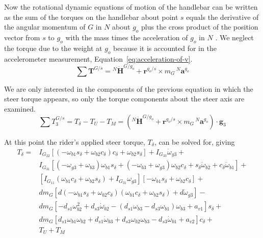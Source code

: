 \documentclass[10pt]{article}
\begin{document}
Now the rotational dynamic equations of motion of the handlebar can be written as the sum
of the torques on the handlebar about point $s$ equals the derivative of
the angular momentum of $G$ in $N$ about $g_o$ plus the cross product of the
position vector from $s$ to $g_o$ with the mass times the acceleration of $g_o$ in $N$
\cite{Meriam1975}. We neglect the torque due to the weight at $g_o$ because it
is accounted for in the accelerometer measurement, Equation~\ref{eq:acceleration-of-v}.
%
\begin{equation}
  \sum \mathbf{T}^{G/s} = {}^N\dot{\mathbf{H}}^{G/g_o} +
    \mathbf{r}^{g_o/s} \times m_G\,{}^N\mathbf{a}^{g_o}
\end{equation}

We are only interested in the components of the previous equation in which the
steer torque appears, so only the torque components about the steer axis are examined.
%
\begin{equation}
  \sum T^{G/s}_3 = T_\delta - T_U - T_M = \left({}^N\dot{\mathbf{H}}^{G/g_o} +
  \mathbf{r}^{g_o/s} \times m_G\,{}^N\mathbf{a}^{g_o}\right) \cdot \hat{\mathbf{g}}_3
\end{equation}

At this point the rider's applied steer torque, $T_\delta$, can be solved for,
giving
%
\begin{align}
  T_{\delta} =
    & I_{G_{22}} \left[ \left( -\omega_{b1} s_\delta + \omega_{b2} c_\delta \right)
      c_\delta + \omega_{b2} s_\delta \right] + I_{G_{33}} \dot{\omega}_{g3} + \nonumber \\
    & I_{G_{31}} \left[ (-\omega_{g3} + \omega_{b3} ) \omega_{b1} s_\delta +
      (-\omega_{b3} + \omega_{g3}) \omega_{b2} c_\delta +
      s_\delta \dot{\omega}_{b2} + c_\delta \dot{\omega}_{b1} \right] + \nonumber \\
    & \left[ I_{G_{11}} (\omega_{b1} c_\delta + \omega_{b2}s_\delta) +
      I_{G_{31}} \omega_{g3} \right] \left[-\omega_{b1} s_\delta +
      \omega_{b2} c_\delta \right] + \nonumber \\
    & d m_G \left[ d (-\omega_{b1} s_\delta + \omega_{b2} c_\delta)
      (\omega_{b1} c_\delta + \omega_{b2} s_\delta) + d \dot{\omega}_{g3} \right] - \nonumber \\
    & d m_G \left[-d_{s1} \omega_{b2}^{2} + d_{s3} \dot{\omega}_{b2} -
      (d_{s1} \omega_{b3} - d_{s3} \omega_{b1}) \omega_{b3} + a_{v1} \right] s_\delta + \nonumber \\
    & d m_G \left[d_{s1} \omega_{b1} \omega_{b2} + d_{s1} \dot{\omega}_{b3} +
      d_{s3} \omega_{b2} \omega_{b3} - d_{s3} \dot{\omega}_{b1} + a_{v2} \right]
      c_\delta + \nonumber \\
    & T_U + T_M
    \label{eq:steer-torque}
\end{align}
\end{document}
